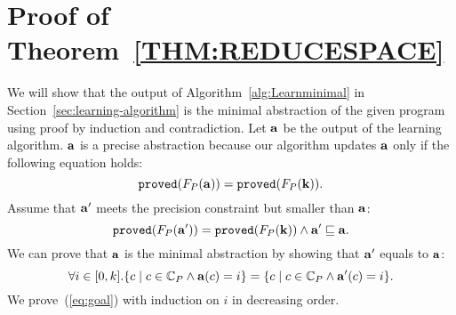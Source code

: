 \chapter{Proof of Theorem~\ref{THM:REDUCESPACE}}\label{sec:proof}


We will show that the output of Algorithm~\ref{alg:Learnminimal} in Section~\ref{sec:learning-algorithm} is the minimal abstraction of the given program using proof by induction and contradiction.
Let ${\bf a}$ be the output of the learning algorithm.  
${\bf a}$ is a precise abstraction because our algorithm updates ${\bf a}$ only if the following equation holds:
\[
{\tt proved}(F_P({\bf a})) = {\tt proved}(F_P({\bf k})).
\]
Assume that ${\bf a}'$ meets the precision constraint but smaller than ${\bf a}$:
\begin{equation}\label{eq:assumption}
{\tt proved}(F_P({\bf a}')) = {\tt proved}(F_P({\bf k})) \land
{\bf a}' \sqsubseteq {\bf a}.
\end{equation}
We can prove that ${\bf a}$ is the minimal abstraction by showing that ${\bf a}'$ equals to ${\bf a}$:
\begin{equation}\label{eq:goal}
\forall i \in [0,k].\{c \mid c \in \mathbb{C}_P \land {\bf a}(c) = i\} = \{c \mid c\in \mathbb{C}_P \land {\bf a}'(c) = i\}.
\end{equation}
We prove~(\ref{eq:goal}) with induction on $i$ in decreasing order.
